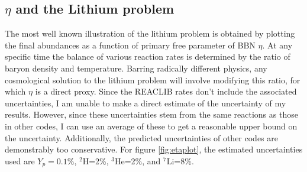 \subsection[eta and the Lithium problem]{$\eta$ and the Lithium problem}
The most well known illustration of the lithium problem is obtained by plotting the final abundances as a function of primary free parameter of BBN $\eta$. At any specific time the balance of various reaction rates is determined by the ratio of baryon density and temperature. Barring radically different physics, any cosmological solution to the lithium problem will involve modifying this ratio, for which $\eta$ is a direct proxy. Since the REACLIB rates don't include the associated uncertainties, I am unable to make a direct estimate of the uncertainty of my results. However, since these uncertainties stem from the same reactions as those in other codes, I can use an average of these to get a reasonable upper bound on the uncertainty. Additionally, the predicted uncertainties of other codes are demonstrably too conservative. For figure \ref{fig:etaplot}, the estimated uncertainties used are $ Y_p=0.1\%$, $^{2}$H=2\%, $^{3}$He=2\%, and $^{7}$Li=8\%.

